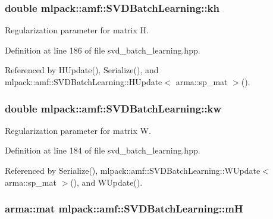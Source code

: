 \subsubsection[{kh}]{\setlength{\rightskip}{0pt plus 5cm}double mlpack\+::amf\+::\+S\+V\+D\+Batch\+Learning\+::kh\hspace{0.3cm}{\ttfamily [private]}}\label{classmlpack_1_1amf_1_1SVDBatchLearning_ada381dbf4c249d020ca1172ba2b14522}


Regularization parameter for matrix H. 



Definition at line 186 of file svd\+\_\+batch\+\_\+learning.\+hpp.



Referenced by H\+Update(), Serialize(), and mlpack\+::amf\+::\+S\+V\+D\+Batch\+Learning\+::\+H\+Update$<$ arma\+::sp\+\_\+mat $>$().

\subsubsection[{kw}]{\setlength{\rightskip}{0pt plus 5cm}double mlpack\+::amf\+::\+S\+V\+D\+Batch\+Learning\+::kw\hspace{0.3cm}{\ttfamily [private]}}\label{classmlpack_1_1amf_1_1SVDBatchLearning_aaee5ceafcb9b97f7380846ca115bc66d}


Regularization parameter for matrix W. 



Definition at line 184 of file svd\+\_\+batch\+\_\+learning.\+hpp.



Referenced by Serialize(), mlpack\+::amf\+::\+S\+V\+D\+Batch\+Learning\+::\+W\+Update$<$ arma\+::sp\+\_\+mat $>$(), and W\+Update().

\subsubsection[{mH}]{\setlength{\rightskip}{0pt plus 5cm}arma\+::mat mlpack\+::amf\+::\+S\+V\+D\+Batch\+Learning\+::mH\hspace{0.3cm}{\ttfamily [private]}}\label{classmlpack_1_1amf_1_1SVDBatchLearning_a7b33197f276bf37458898c9b322f69c8}


